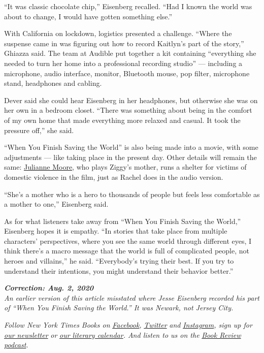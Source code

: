 ``It was classic chocolate chip,'' Eisenberg recalled. ``Had I known the
world was about to change, I would have gotten something else.''

With California on lockdown, logistics presented a challenge. ``Where
the suspense came in was figuring out how to record Kaitlyn's part of
the story,'' Ghiazza said. The team at Audible put together a kit
containing ``everything she needed to turn her home into a professional
recording studio'' --- including a microphone, audio interface, monitor,
Bluetooth mouse, pop filter, microphone stand, headphones and cabling.

Dever said she could hear Eisenberg in her headphones, but otherwise she
was on her own in a bedroom closet. ``There was something about being in
the comfort of my own home that made everything more relaxed and casual.
It took the pressure off,'' she said.

``When You Finish Saving the World'' is also being made into a movie,
with some adjustments --- like taking place in the present day. Other
details will remain the same:
\href{https://www.nytimes3xbfgragh.onion/2019/03/06/movies/julianne-moore-gloria-bell.html}{Julianne
Moore}, who plays Ziggy's mother, runs a shelter for victims of domestic
violence in the film, just as Rachel does in the audio version.

``She's a mother who is a hero to thousands of people but feels less
comfortable as a mother to one,'' Eisenberg said.

As for what listeners take away from ``When You Finish Saving the
World,'' Eisenberg hopes it is empathy. ``In stories that take place
from multiple characters' perspectives, where you see the same world
through different eyes, I think there's a macro message that the world
is full of complicated people, not heroes and villains,'' he said.
``Everybody's trying their best. If you try to understand their
intentions, you might understand their behavior better.''

\emph{\textbf{Correction: Aug. 2, 2020}}\\
\emph{An earlier version of this article misstated where Jesse Eisenberg
recorded his part of ``When You Finish Saving the World.'' It was
Newark, not Jersey City.}

\emph{Follow New York Times Books on}
\href{https://www.facebookcorewwwi.onion/nytbooks/}{\emph{Facebook}}\emph{,}
\href{https://twitter.com/nytimesbooks}{\emph{Twitter}} \emph{and}
\href{https://www.instagram.com/nytbooks/}{\emph{Instagram}}\emph{, sign
up for}
\href{https://www.nytimes3xbfgragh.onion/newsletters/books-review}{\emph{our
newsletter}} \emph{or}
\href{https://www.nytimes3xbfgragh.onion/interactive/2017/books/books-calendar.html}{\emph{our
literary calendar}}\emph{. And listen to us on the}
\href{https://www.nytimes3xbfgragh.onion/column/book-review-podcast}{\emph{Book
Review podcast}}\emph{.}

